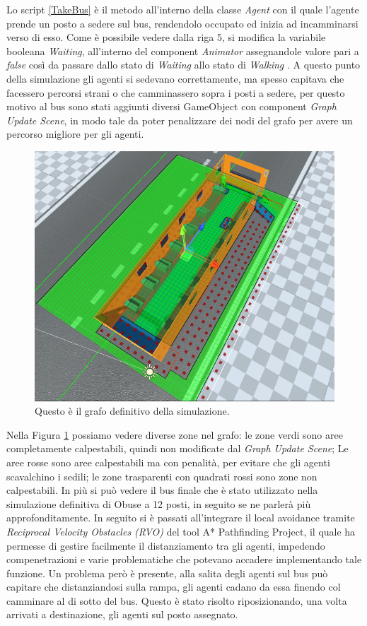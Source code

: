\documentclass[12pt, openany]{book}
\begin{document}
	Lo script \ref{TakeBus} è il metodo all'interno della classe \emph{Agent} con il quale l'agente prende un posto a sedere sul bus, rendendolo occupato ed inizia ad incamminarsi verso di esso. Come è possibile vedere dalla riga 5, si modifica la variabile booleana \emph{Waiting}, all'interno del component \emph{Animator} assegnandole valore pari a \emph{false} così da passare dallo stato di \emph{Waiting} allo stato di \emph{Walking} .  \newpage
	A questo punto della simulazione gli agenti si sedevano correttamente, ma spesso capitava che facessero percorsi strani o che camminassero sopra i posti a sedere, per questo motivo al bus sono stati aggiunti diversi GameObject con component \emph{Graph Update Scene}, in modo tale da poter penalizzare dei nodi del grafo per avere un percorso migliore per gli agenti.
	\begin{figure}[H]
		\centering
		\includegraphics[width=1\linewidth]{"Immagini/AreaGrafo.png"}
		\caption{Questo è il grafo definitivo della simulazione.}
		\label{fig:AreaGrafo}
	\end{figure}
	Nella Figura \ref{fig:AreaGrafo} possiamo vedere diverse zone nel grafo: le zone verdi sono aree completamente calpestabili, quindi non modificate dal \emph{Graph Update Scene}; Le aree rosse sono aree calpestabili ma con penalità, per evitare che gli agenti scavalchino i sedili; le zone trasparenti con quadrati rossi sono zone non calpestabili. In più si può vedere il bus finale che è stato utilizzato nella simulazione definitiva di Obuse a 12 posti, in seguito se ne parlerà più approfonditamente.
	In seguito si è passati all'integrare il local avoidance tramite \emph{Reciprocal Velocity Obstacles (RVO)} del tool A* Pathfinding Project, il quale ha permesse di gestire facilmente il distanziamento tra gli agenti, impedendo compenetrazioni e varie problematiche che potevano accadere implementando tale funzione. Un problema però è presente, alla salita degli agenti sul bus può capitare che distanziandosi sulla rampa, gli agenti cadano da essa finendo col camminare al di sotto del bus. Questo è stato risolto riposizionando, una volta arrivati a destinazione, gli agenti sul posto assegnato.
	
\end{document}
